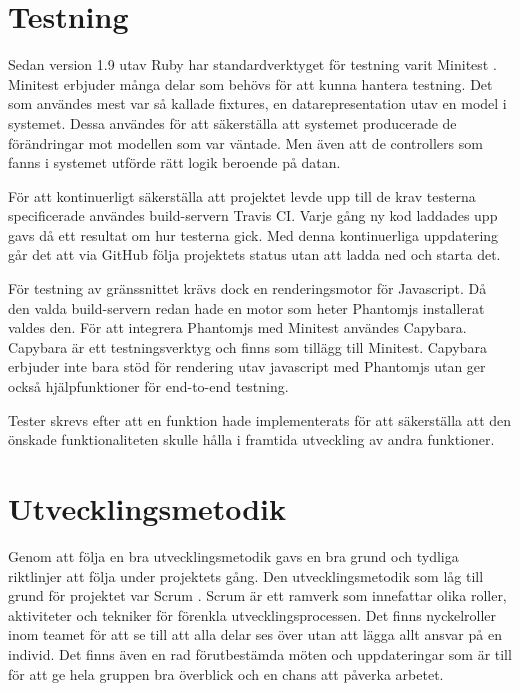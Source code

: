 \section{Testning}

Sedan version 1.9 utav Ruby har standardverktyget för testning varit Minitest \cite{rubychangelog}. Minitest erbjuder många delar som behövs för att kunna hantera testning. Det som användes mest var så kallade fixtures, en datarepresentation utav en model i systemet. Dessa användes för att säkerställa att systemet producerade de förändringar mot modellen som var väntade. Men även att de controllers som fanns i systemet utförde rätt logik beroende på datan.

För att kontinuerligt säkerställa att projektet levde upp till de krav testerna specificerade användes build-servern Travis CI. Varje gång ny kod laddades upp gavs då ett resultat om hur testerna gick. Med denna kontinuerliga uppdatering går det att via GitHub följa projektets status utan att ladda ned och starta det.

För testning av gränssnittet krävs dock en renderingsmotor för Javascript. Då den valda build-servern redan hade en motor som heter Phantomjs installerat valdes den. För att integrera Phantomjs med Minitest användes Capybara. Capybara är ett testningsverktyg och finns som tillägg till Minitest. Capybara erbjuder inte bara stöd för rendering utav javascript med Phantomjs utan ger också hjälpfunktioner för end-to-end testning.

Tester skrevs efter att en funktion hade implementerats för att säkerställa att den önskade funktionaliteten skulle hålla i framtida utveckling av andra funktioner.

\section{Utvecklingsmetodik}

Genom att följa en bra utvecklingsmetodik gavs en bra grund och tydliga riktlinjer att följa under projektets gång. Den utvecklingsmetodik som låg till grund för projektet var Scrum \cite{scrumguide}. Scrum är ett ramverk som innefattar olika roller, aktiviteter och tekniker för förenkla utvecklingsprocessen. Det finns nyckelroller inom teamet för att se till att alla delar ses över utan att lägga allt ansvar på en individ. Det finns även en rad förutbestämda möten och uppdateringar som är till för att ge hela gruppen bra överblick och en chans att påverka arbetet.

